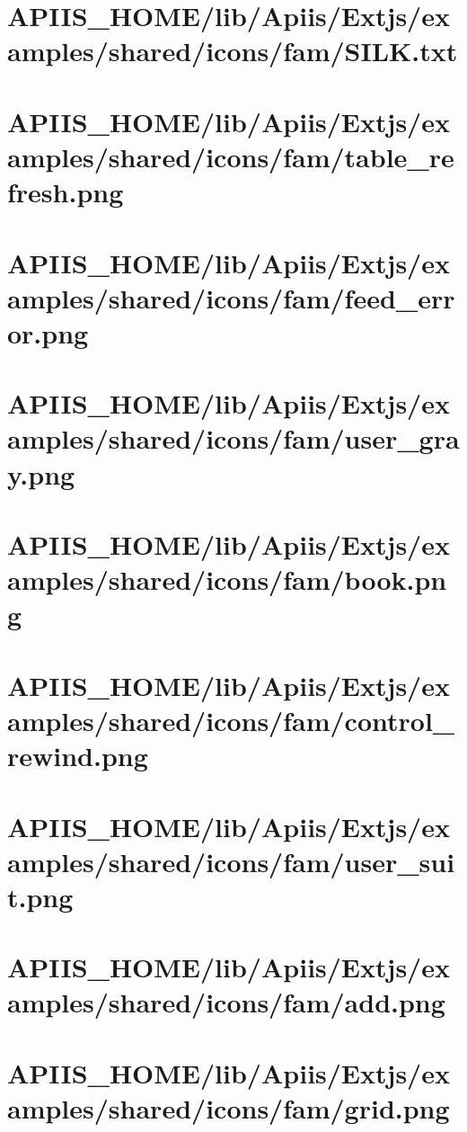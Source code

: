 \section{APIIS\_HOME/lib/Apiis/Extjs/examples/shared/icons/fam/SILK.txt} 
\section{APIIS\_HOME/lib/Apiis/Extjs/examples/shared/icons/fam/table\_refresh.png} 
\section{APIIS\_HOME/lib/Apiis/Extjs/examples/shared/icons/fam/feed\_error.png} 
\section{APIIS\_HOME/lib/Apiis/Extjs/examples/shared/icons/fam/user\_gray.png} 
\section{APIIS\_HOME/lib/Apiis/Extjs/examples/shared/icons/fam/book.png} 
\section{APIIS\_HOME/lib/Apiis/Extjs/examples/shared/icons/fam/control\_rewind.png} 
\section{APIIS\_HOME/lib/Apiis/Extjs/examples/shared/icons/fam/user\_suit.png} 
\section{APIIS\_HOME/lib/Apiis/Extjs/examples/shared/icons/fam/add.png} 
\section{APIIS\_HOME/lib/Apiis/Extjs/examples/shared/icons/fam/grid.png} 

